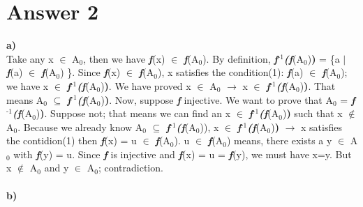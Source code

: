 \documentclass[11pt]{article}
\begin{document}
\section*{Answer 2}
\textbf{a)}\\
Take any x $\in$ A$_\text{0}$, then we have \textbf{\textit{f}}(x) $\in$ \textbf{\textit{f}}(A$_\text{0}$). By definition, \textbf{\textit{f$^\text{-1}$}}\textbf{\textit{(f}}(A$_\text{0}$)\textbf{)} = \{a $\mid$ \textbf{\textit{f}}(a) $\in$ \textbf{\textit{f}}(A$_\text{0}$) \}. Since \textbf{\textit{f}}(x) $\in$ \textbf{\textit{f}}(A$_\text{0}$), x satisfies the condition(1):  \textbf{\textit{f}}(a) $\in$ \textbf{\textit{f}}(A$_\text{0}$); we have x $\in$ \textbf{\textit{f$^\text{-1}$}}\textbf{\textit{(f}}(A$_\text{0}$)\textbf{)}. We have proved x $\in$ A$_\text{0}$ $\xrightarrow{}$ x $\in$ \textbf{\textit{f$^\text{-1}$}}\textbf{\textit{(f}}(A$_\text{0}$)\textbf{)}. That means A$_\text{0}$ $\subseteq$ \textbf{\textit{f$^\text{-1}$}}\textbf{\textit{(f}}(A$_\text{0}$)\textbf{)}. Now, suppose \textbf{\textit{f}} injective. We want to prove that A$_\text{0}$ = \textbf{\textit{f$^\text{-1}$}}\textbf{\textit{(f}}(A$_\text{0}$)\textbf{)}. Suppose not; that means we can find an x $\in$ \textbf{\textit{f$^\text{-1}$}}\textbf{\textit{(f}}(A$_\text{0}$)\textbf{)} such that x $\notin$ A$_\text{0}$. Because we already know A$_\text{0}$ $\subseteq$ \textbf{\textit{f$^\text{-1}$}}\textbf{\textit{(f}}(A$_\text{0}$)),  x $\in$ \textbf{\textit{f$^\text{-1}$}}\textbf{\textit{(f}}(A$_\text{0}$)\textbf{)} $\xrightarrow{}$ x satisfies the contidion(1) then \textbf{\textit{f}}(x) = u $\in$ \textbf{\textit{f}}(A$_\text{0}$). u $\in$ \textbf{\textit{f}}(A$_\text{0}$) means, there exists a y $\in$ A$_\text{0}$ with \textbf{\textit{f}}(y) = u. Since \textbf{\textit{f}} is injective and \textbf{\textit{f}}(x) = u = \textbf{\textit{f}}(y), we must have x=y. But x $\notin$ A$_\text{0}$ and y $\in$ A$_\text{0}$; contradiction. \\
\\
\textbf{b)}\\
\end{document}
